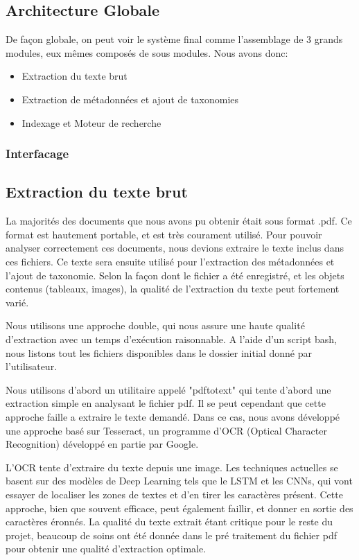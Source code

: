 \subsection{Architecture Globale}
De façon globale, on peut voir le système final comme l'assemblage de 3 grands modules, eux mêmes composés de sous modules. Nous avons donc:
\begin{itemize}
	\item Extraction du texte brut
	\item Extraction de métadonnées et ajout de taxonomies
	\item Indexage et Moteur de recherche
\end{itemize}

\subsubsection{Interfacage}

\subsection{Extraction du texte brut}
La majorités des documents que nous avons pu obtenir était sous format .pdf. Ce format est hautement portable, et est très courament utilisé. Pour pouvoir analyser correctement ces documents, nous devions extraire le texte inclus dans ces fichiers. Ce texte sera ensuite utilisé pour l'extraction des métadonnées et l'ajout de taxonomie. Selon la façon dont le fichier a été enregistré, et les objets contenus (tableaux, images), la qualité de l'extraction du texte peut fortement varié. 

Nous utilisons une approche double, qui nous assure une haute qualité d'extraction avec un temps d'exécution raisonnable. A l'aide d'un script bash, nous listons tout les fichiers disponibles dans le dossier initial donné par l'utilisateur. 

Nous utilisons d'abord un utilitaire appelé "pdftotext" qui tente d'abord une extraction simple en analysant le fichier pdf. Il se peut cependant que cette approche faille a extraire le texte demandé. Dans ce cas, nous avons développé une approche basé sur Tesseract, un programme d'OCR (Optical Character Recognition) développé en partie par Google. 

L'OCR tente d'extraire du texte depuis une image. Les techniques actuelles se basent sur des modèles de Deep Learning tels que le LSTM et les CNNs, qui vont essayer de localiser les zones de textes et d'en tirer les caractères présent. Cette approche, bien que souvent efficace, peut également faillir, et donner en sortie des caractères éronnés. La qualité du texte extrait étant critique pour le reste du projet, beaucoup de soins ont été donnée dans le pré traitement du fichier pdf pour obtenir une qualité d'extraction optimale.

